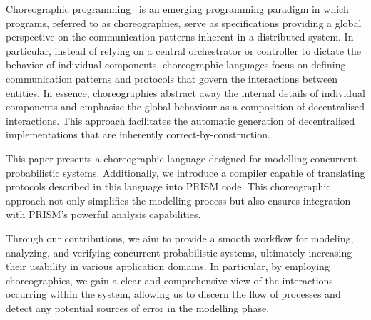 Choreographic programming~\cite{M23} is an emerging programming
paradigm in which programs, referred to as choreographies, serve as
specifications providing a global perspective on the communication
patterns inherent in a distributed system. 
%
In particular, instead of relying on a central orchestrator or
controller to dictate the behavior of individual components,
choreographic languages focus on defining communication patterns and
protocols that govern the interactions between entities.
%
In essence, choreographies abstract away the internal details of
individual components and emphasise the global behaviour as a
composition of decentralised interactions. %
%
This approach facilitates the automatic generation of decentralised
implementations that are inherently correct-by-construction.

This paper presents a choreographic language designed for modelling
concurrent probabilistic systems.
Additionally, we introduce a compiler capable of translating protocols
described in this language into PRISM code. This choreographic
approach not only simplifies the modelling process but also ensures
integration with PRISM's powerful analysis capabilities. 




Through our contributions, we aim to provide a smooth workflow for
modeling, analyzing, and verifying concurrent probabilistic systems,
ultimately increasing their usability in various application domains.
%
In particular, by employing choreographies, we gain a clear and
comprehensive view of the interactions occurring within the system,
allowing us to discern the flow of processes and detect any potential
sources of error in the modelling phase.


